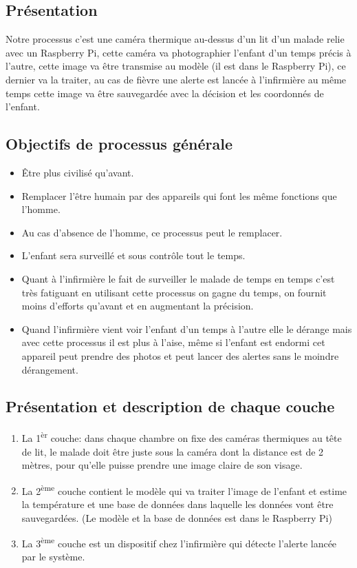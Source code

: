 \documentclass[12pt]{article}
\begin{document}
\subsection{Présentation}
Notre processus c’est une caméra thermique au-dessus d’un lit d’un malade relie avec un Raspberry Pi, cette caméra va photographier l’enfant d'un temps précis à l'autre, cette image va être transmise au modèle (il est dans le Raspberry Pi), ce dernier va la traiter, au cas de fièvre une alerte est lancée à l’infirmière au même temps cette image va être sauvegardée avec la décision et les coordonnés de l’enfant.

\subsection{Objectifs de processus générale}
\begin{itemize}
	\item Être plus civilisé qu’avant.
	\item Remplacer l’être humain par des appareils qui font les même fonctions que l’homme.
	\item Au cas d’absence de l’homme, ce processus peut le remplacer.
	\item L’enfant sera surveillé et sous contrôle tout le temps.
	\item Quant à l'infirmière le fait de surveiller le malade de temps en temps c'est très fatiguant en utilisant cette processus on gagne du temps, on fournit moins d'efforts qu'avant et en augmentant la précision.	
	\item Quand l'infirmière vient voir l'enfant d'un temps à l'autre elle le dérange mais avec cette processus il est plus à l'aise, même si l'enfant est endormi cet appareil peut prendre des photos et peut lancer des alertes sans le moindre dérangement.
\end{itemize}

\subsection{Présentation et description de chaque couche}
\begin{enumerate}
		\item La 1\textsuperscript{èr} couche: dans chaque chambre on fixe des caméras thermiques  au tête de lit, le malade doit être juste sous la caméra dont la distance est de 2 mètres, pour qu’elle puisse prendre une image claire de son visage.
		\item La 2\textsuperscript{ème} couche contient le modèle qui va traiter l'image de l’enfant et estime la température et une base de données dans laquelle les données vont être sauvegardées. (Le modèle et la base de données est dans le Raspberry Pi)
		\item La 3\textsuperscript{ème} couche est un dispositif chez l'infirmière qui détecte l’alerte lancée par le système.
\end{enumerate}
\end{document}
